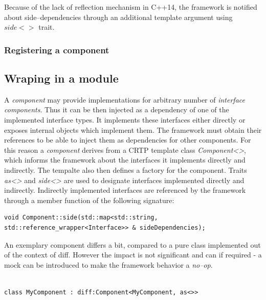 \documentclass[preprint,12pt, a4paper]{elsarticle}
\begin{document}
Because of the lack of reflection mechanism in C++14, the framework is notified about side--dependencies through an additional template argument using $side<>$ trait.

\subsubsection{Registering a component}


\subsection{Wraping in a module}




A \textit{component} may provide implementations for arbitrary number of \textit{interface components}. Thus it can be then injected as a dependency of one of the implemented interface types. It implements these interfaces either directly or exposes internal objects which implement them. The framework must obtain their references to be able to inject them as dependencies for other components. For this reason a \textit{component} derives from a CRTP template class \textit{Component<>}, which informs the framework about the interfaces it implements directly and indirectly. The tempalte also then defines a factory for the component. Traits \textit{as<>} and \textit{side<>} are used to designate interfaces implemented directly and indirectly. Indirectly implemented interfaces are referenced by the framework through a member function of the following signature:

\begin{verbatim}
void Component::side(std::map<std::string, std::reference_wrapper<Interface>> & sideDependencies);
\end{verbatim}

An exemplary component differs a bit, compared to a pure class implemented out of the context of diff. However the impact is not significant and can if required - a mock can be introduced to make the framework behavior a \textit{no--op}.

\begin{verbatim}

class MyComponent : diff:Component<MyComponent, as<>>
    
\end{verbatim}



\end{document}
